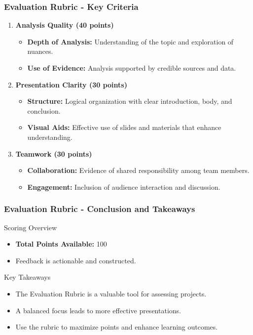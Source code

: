 \documentclass{beamer}
\begin{document}
\begin{frame}[fragile]
    \frametitle{Evaluation Rubric - Key Criteria}
    \begin{enumerate}
        \item \textbf{Analysis Quality (40 points)}
        \begin{itemize}
            \item \textbf{Depth of Analysis:} Understanding of the topic and exploration of nuances.
            \item \textbf{Use of Evidence:} Analysis supported by credible sources and data.
        \end{itemize}

        \item \textbf{Presentation Clarity (30 points)}
        \begin{itemize}
            \item \textbf{Structure:} Logical organization with clear introduction, body, and conclusion.
            \item \textbf{Visual Aids:} Effective use of slides and materials that enhance understanding.
        \end{itemize}

        \item \textbf{Teamwork (30 points)}
        \begin{itemize}
            \item \textbf{Collaboration:} Evidence of shared responsibility among team members.
            \item \textbf{Engagement:} Inclusion of audience interaction and discussion.
        \end{itemize}
    \end{enumerate}
\end{frame}

\begin{frame}[fragile]
    \frametitle{Evaluation Rubric - Conclusion and Takeaways}
    \begin{block}{Scoring Overview}
        \begin{itemize}
            \item \textbf{Total Points Available:} 100
            \item Feedback is actionable and constructed.
        \end{itemize}
    \end{block}

    \begin{block}{Key Takeaways}
        \begin{itemize}
            \item The Evaluation Rubric is a valuable tool for assessing projects.
            \item A balanced focus leads to more effective presentations.
            \item Use the rubric to maximize points and enhance learning outcomes.
        \end{itemize}
    \end{block}
\end{frame}
\end{document}
